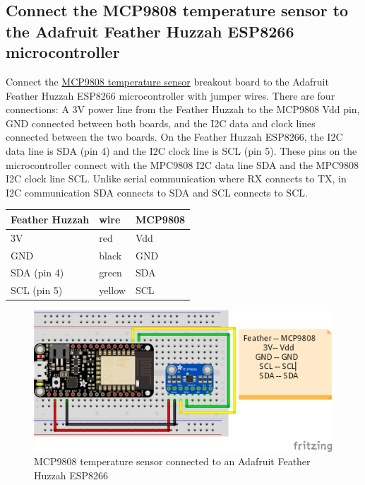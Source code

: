 \documentclass{book}
\makeatletter
\def\maxwidth{\ifdim\Gin@nat@width>\linewidth\linewidth
    \else\Gin@nat@width\fi}
\let\Oldincludegraphics\includegraphics
\renewcommand{\includegraphics}[1]{\Oldincludegraphics[width=.8\maxwidth]{#1}}
\makeatother
\begin{document}
    
        \subsection{Connect the MCP9808 temperature sensor to the Adafruit
Feather Huzzah ESP8266
microcontroller}\label{connect-the-mcp9808-temperature-sensor-to-the-adafruit-feather-huzzah-esp8266-microcontroller}
    




    
        Connect the \href{https://www.adafruit.com/product/1782}{MCP9808
temperature sensor} breakout board to the Adafruit Feather Huzzah
ESP8266 microcontroller with jumper wires. There are four connections: A
3V power line from the Feather Huzzah to the MCP9808 Vdd pin, GND
connected between both boards, and the I2C data and clock lines
connected between the two boards. On the Feather Huzzah ESP8266, the I2C
data line is SDA (pin 4) and the I2C clock line is SCL (pin 5). These
pins on the microcontroller connect with the MPC9808 I2C data line SDA
and the MPC9808 I2C clock line SCL. Unlike serial communication where RX
connects to TX, in I2C communication SDA connects to SDA and SCL
connects to SCL.

\begin{longtable}[]{@{}lll@{}}
\toprule
Feather Huzzah & wire & MCP9808\tabularnewline
\midrule
\endhead
3V & red & Vdd\tabularnewline
GND & black & GND\tabularnewline
SDA (pin 4) & green & SDA\tabularnewline
SCL (pin 5) & yellow & SCL\tabularnewline
\bottomrule
\end{longtable}

\begin{figure}
\centering
\includegraphics{images/feather_huzzah_temp_sensor_fritzing.png}
\caption{MCP9808 temperature sensor connected to an Adafruit Feather
Huzzah ESP8266}
\end{figure}
    
\end{document}
